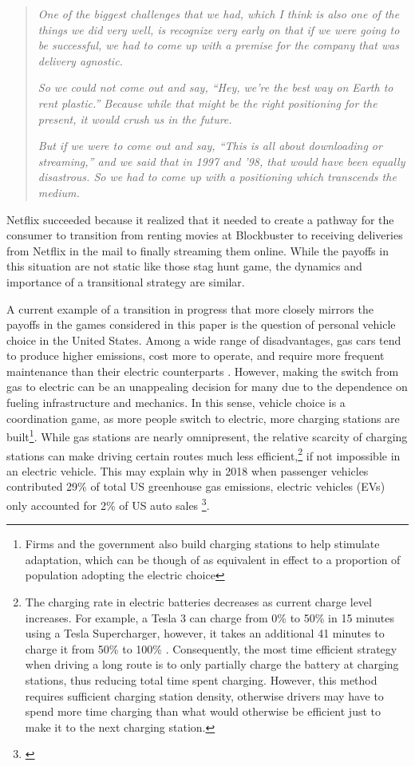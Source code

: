 \begin{quote}
    \textit{One of the biggest challenges that we had, which I think is also one of the things we did very well, is recognize very early on that if we were going to be successful, we had to come up with a premise for the company that was delivery agnostic.}
    
    \textit{So we could not come out and say, “Hey, we're the best way on Earth to rent plastic.” Because while that might be the right positioning for the present, it would crush us in the future.}
    
    \textit{But if we were to come out and say, “This is all about downloading or streaming,” and we said that in 1997 and '98, that would have been equally disastrous. So we had to come up with a positioning which transcends the medium.}
\end{quote}

Netflix succeeded because it realized that it needed to create a pathway for the consumer to transition from renting movies at Blockbuster to receiving deliveries from Netflix in the mail to finally streaming them online. While the payoffs in this situation are not static like those stag hunt game, the dynamics and importance of a transitional strategy are similar.

A current example of a transition in progress that more closely mirrors the payoffs in the games considered in this paper is the question of personal vehicle choice in the United States. Among a wide range of disadvantages, gas cars tend to produce higher emissions, cost more to operate, and require more frequent maintenance than their electric counterparts \citep{malmgren2016quantifying, harto2020electric}. However, making the switch from gas to electric can be an unappealing decision for many due to the dependence on fueling infrastructure and mechanics. In this sense, vehicle choice is a coordination game, as more people switch to electric, more charging stations are built\footnote{Firms and the government also build charging stations to help stimulate adaptation, which can be though of as equivalent in effect to a proportion of population adopting the electric choice}. While gas stations are nearly omnipresent, the relative scarcity of charging stations can make driving certain routes much less efficient,\footnote{The charging rate in electric batteries decreases as current charge level increases. For example, a Tesla 3 can charge from 0\% to 50\% in 15 minutes using a Tesla Supercharger, however, it takes an additional 41 minutes to charge it from 50\% to 100\% \citep{chargingtime}. Consequently, the most time efficient strategy when driving a long route is to only partially charge the battery at charging stations, thus reducing total time spent charging. However, this method requires sufficient charging station density, otherwise drivers may have to spend more time charging than what would otherwise be efficient just to make it to the next charging station.} if not impossible in an electric vehicle. This may explain why in 2018 when passenger vehicles contributed 29\% of total US greenhouse gas emissions, electric vehicles (EVs) only accounted for 2\% of US auto sales \footnote{\cite{uaw_report}}.

